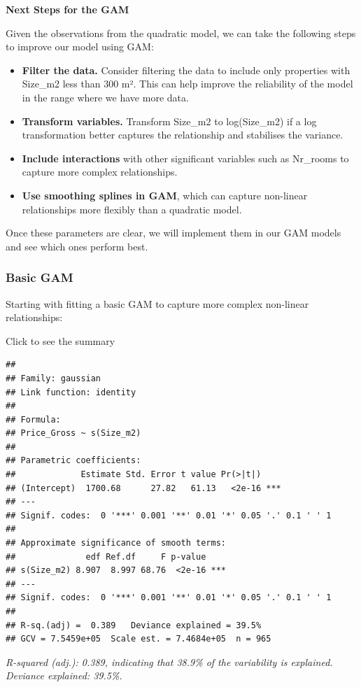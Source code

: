 \documentclass[
]{article}
\begin{document}
\textbf{Next Steps for the GAM}

Given the observations from the quadratic model, we can take the
following steps to improve our model using GAM:

\begin{itemize}
\item
  \textbf{Filter the data.} Consider filtering the data to include only
  properties with Size\_m2 less than 300 m². This can help improve the
  reliability of the model in the range where we have more data.
\item
  \textbf{Transform variables.} Transform Size\_m2 to log(Size\_m2) if a
  log transformation better captures the relationship and stabilises the
  variance.
\item
  \textbf{Include interactions} with other significant variables such as
  Nr\_rooms to capture more complex relationships.
\item
  \textbf{Use smoothing splines in GAM}, which can capture non-linear
  relationships more flexibly than a quadratic model.
\end{itemize}

Once these parameters are clear, we will implement them in our GAM
models and see which ones perform best.

\subsubsection{Basic GAM}\label{basic-gam}

Starting with fitting a basic GAM to capture more complex non-linear
relationships:

Click to see the summary

\begin{verbatim}
## 
## Family: gaussian 
## Link function: identity 
## 
## Formula:
## Price_Gross ~ s(Size_m2)
## 
## Parametric coefficients:
##             Estimate Std. Error t value Pr(>|t|)    
## (Intercept)  1700.68      27.82   61.13   <2e-16 ***
## ---
## Signif. codes:  0 '***' 0.001 '**' 0.01 '*' 0.05 '.' 0.1 ' ' 1
## 
## Approximate significance of smooth terms:
##              edf Ref.df     F p-value    
## s(Size_m2) 8.907  8.997 68.76  <2e-16 ***
## ---
## Signif. codes:  0 '***' 0.001 '**' 0.01 '*' 0.05 '.' 0.1 ' ' 1
## 
## R-sq.(adj) =  0.389   Deviance explained = 39.5%
## GCV = 7.5459e+05  Scale est. = 7.4684e+05  n = 965
\end{verbatim}

\emph{R-squared (adj.): 0.389, indicating that 38.9\% of the variability
is explained. Deviance explained: 39.5\%.}
\end{document}

